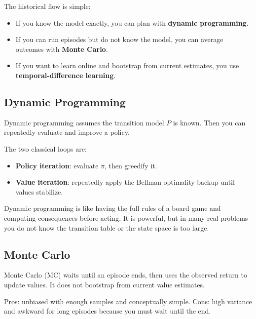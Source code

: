 \documentclass[11pt]{article}
\begin{document}
  The historical flow is simple:

  \begin{itemize}
    \item If you know the model exactly, you can plan with \textbf{dynamic programming}.
    \item If you can run episodes but do not know the model, you can average outcomes with \textbf{Monte Carlo}.
    \item If you want to learn online and bootstrap from current estimates, you use \textbf{temporal-difference learning}.
  \end{itemize}

  \subsection{Dynamic Programming}

  Dynamic programming assumes the transition model $P$ is known. Then you can repeatedly evaluate and improve a policy.

  The two classical loops are:

  \begin{itemize}
    \item \textbf{Policy iteration}: evaluate $\pi$, then greedify it.
    \item \textbf{Value iteration}: repeatedly apply the Bellman optimality backup until values stabilize.
  \end{itemize}

  \begin{intuitionbox}
  Dynamic programming is like having the full rules of a board game and computing consequences before acting. It is powerful, but in many real problems you do not know the transition table or the state space is too large.
  \end{intuitionbox}

  \subsection{Monte Carlo}

  Monte Carlo (MC) waits until an episode ends, then uses the observed return to update values. It does not bootstrap from current value estimates.

  Pros: unbiased with enough samples and conceptually simple.\newline
  Cons: high variance and awkward for long episodes because you must wait until the end.
\end{document}
